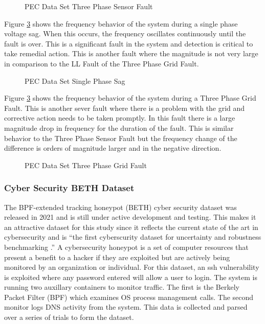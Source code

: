 \begin{figure}[H]
    
    \caption{PEC Data Set Three Phase Sensor Fault}
    \label{fig:pec_three_phase_sensor}
\end{figure}

Figure \ref{fig:pec_three_phase_grid_fault} shows the frequency behavior of the system during a single phase voltage sag. When this occurs, the frequency oscillates continuously until the fault is over. This is a significant fault in the system and detection is critical to take remedial action. This is another fault where the magnitude is not very large in comparison to the LL Fault of the Three Phase Grid Fault.

\begin{figure}[H]
    
    \caption{PEC Data Set Single Phase Sag}
    \label{fig:pec_single_phase_sag}
\end{figure}

Figure \ref{fig:pec_three_phase_grid_fault} shows the frequency behavior of the system during a Three Phase Grid Fault. This is another sever fault where there is a problem with the grid and corrective action needs to be taken promptly. In this fault there is a large magnitude drop in frequency for the duration of the fault. This is similar behavior to the Three Phase Sensor Fault but the frequency change of the difference is orders of magnitude larger and in the negative direction.

\begin{figure}[H]
    
    \caption{PEC Data Set Three Phase Grid Fault}
    \label{fig:pec_three_phase_grid_fault}
\end{figure}


\subsubsection{Cyber Security BETH Dataset}
\label{ref_beth_dataset}

The BPF-extended tracking honeypot (BETH) cyber security dataset was released in 2021 and is still under active development and testing. This makes it an attractive dataset for this study since it reflects the current state of the art in cybersecurity and is ``the first cyberscurity dataset for uncertainty and robustness benchmarking \parencite{beth-dataset}.'' A cybersecurity honeypot is a set of computer resources that present a benefit to a hacker if they are exploited but are actively being monitored by an organization or individual. For this dataset, an ssh vulnerability is exploited where any password entered will allow a user to login. The system is running two auxillary containers to monitor traffic. The first is the Berkely Packet Filter (BPF) which examines OS process management calls. The second monitor logs DNS activity from the system. This data is collected and parsed over a series of trials to form the dataset.

